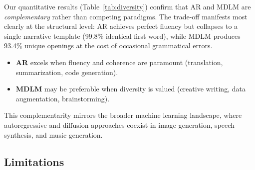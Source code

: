 \documentclass[11pt,a4paper]{article}
\begin{document}
Our quantitative results (Table~\ref{tab:diversity}) confirm that AR and MDLM are \emph{complementary} rather than competing paradigms.
The trade-off manifests most clearly at the structural level: AR achieves perfect fluency but collapses to a single narrative template (99.8\% identical first word), while MDLM produces 93.4\% unique openings at the cost of occasional grammatical errors.
\begin{itemize}[leftmargin=*,itemsep=2pt]
  \item \textbf{AR} excels when fluency and coherence are paramount (translation, summarization, code generation).
  \item \textbf{MDLM} may be preferable when diversity is valued (creative writing, data augmentation, brainstorming).
\end{itemize}
This complementarity mirrors the broader machine learning landscape, where autoregressive and diffusion approaches coexist in image generation, speech synthesis, and music generation.

\subsection{Limitations}
\label{sec:limitations}
\end{document}
